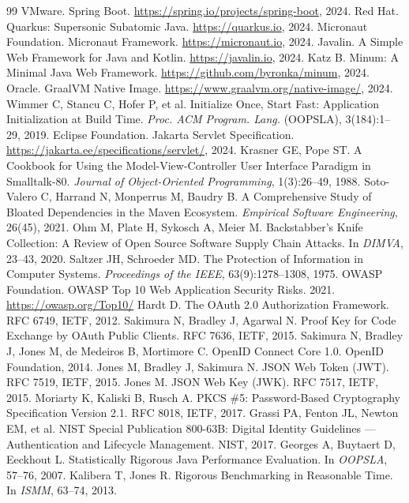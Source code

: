 \documentclass[AMA]{USG}
\begin{document}
\begin{thebibliography}{99}
 VMware. Spring Boot. \url{https://spring.io/projects/spring-boot}, 2024.
 Red Hat. Quarkus: Supersonic Subatomic Java. \url{https://quarkus.io}, 2024.
 Micronaut Foundation. Micronaut Framework. \url{https://micronaut.io}, 2024.
 Javalin. A Simple Web Framework for Java and Kotlin. \url{https://javalin.io}, 2024.
 Katz B. Minum: A Minimal Java Web Framework. \url{https://github.com/byronka/minum}, 2024.
 Oracle. GraalVM Native Image. \url{https://www.graalvm.org/native-image/}, 2024.
 Wimmer C, Stancu C, Hofer P, et al. Initialize Once, Start Fast: Application Initialization at Build Time. \emph{Proc. ACM Program. Lang.} (OOPSLA), 3(184):1--29, 2019.
 Eclipse Foundation. Jakarta Servlet Specification. \url{https://jakarta.ee/specifications/servlet/}, 2024.
 Krasner GE, Pope ST. A Cookbook for Using the Model-View-Controller User Interface Paradigm in Smalltalk-80. \emph{Journal of Object-Oriented Programming}, 1(3):26--49, 1988.
 Soto-Valero C, Harrand N, Monperrus M, Baudry B. A Comprehensive Study of Bloated Dependencies in the Maven Ecosystem. \emph{Empirical Software Engineering}, 26(45), 2021.
 Ohm M, Plate H, Sykosch A, Meier M. Backstabber's Knife Collection: A Review of Open Source Software Supply Chain Attacks. In \emph{DIMVA}, 23--43, 2020.
 Saltzer JH, Schroeder MD. The Protection of Information in Computer Systems. \emph{Proceedings of the IEEE}, 63(9):1278--1308, 1975.
 OWASP Foundation. OWASP Top 10 Web Application Security Risks. 2021. \url{https://owasp.org/Top10/}
 Hardt D. The OAuth 2.0 Authorization Framework. RFC 6749, IETF, 2012.
 Sakimura N, Bradley J, Agarwal N. Proof Key for Code Exchange by OAuth Public Clients. RFC 7636, IETF, 2015.
 Sakimura N, Bradley J, Jones M, de Medeiros B, Mortimore C. OpenID Connect Core 1.0. OpenID Foundation, 2014.
 Jones M, Bradley J, Sakimura N. JSON Web Token (JWT). RFC 7519, IETF, 2015.
 Jones M. JSON Web Key (JWK). RFC 7517, IETF, 2015.
 Moriarty K, Kaliski B, Rusch A. PKCS \#5: Password-Based Cryptography Specification Version 2.1. RFC 8018, IETF, 2017.
 Grassi PA, Fenton JL, Newton EM, et al. NIST Special Publication 800-63B: Digital Identity Guidelines --- Authentication and Lifecycle Management. NIST, 2017.
 Georges A, Buytaert D, Eeckhout L. Statistically Rigorous Java Performance Evaluation. In \emph{OOPSLA}, 57--76, 2007.
 Kalibera T, Jones R. Rigorous Benchmarking in Reasonable Time. In \emph{ISMM}, 63--74, 2013.
\end{thebibliography}
\end{document}
